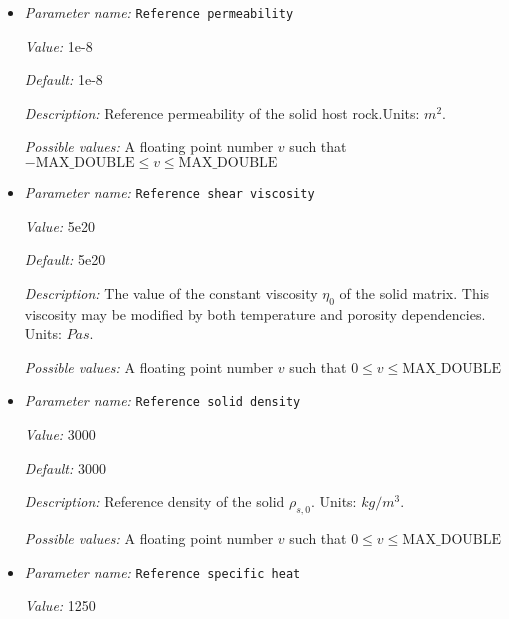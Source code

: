 \begin{itemize}
{\it Possible values:} A floating point number $v$ such that $0 \leq v \leq \text{MAX\_DOUBLE}$
\item {\it Parameter name:} {\tt Reference permeability}
\label{parameters:Material model/Melt global/Reference permeability}


{\it Value:} 1e-8


{\it Default:} 1e-8


{\it Description:} Reference permeability of the solid host rock.Units: $m^2$.


{\it Possible values:} A floating point number $v$ such that $-\text{MAX\_DOUBLE} \leq v \leq \text{MAX\_DOUBLE}$
\item {\it Parameter name:} {\tt Reference shear viscosity}
\label{parameters:Material model/Melt global/Reference shear viscosity}


{\it Value:} 5e20


{\it Default:} 5e20


{\it Description:} The value of the constant viscosity $\eta_0$ of the solid matrix. This viscosity may be modified by both temperature and porosity dependencies. Units: $Pa s$.


{\it Possible values:} A floating point number $v$ such that $0 \leq v \leq \text{MAX\_DOUBLE}$
\item {\it Parameter name:} {\tt Reference solid density}
\label{parameters:Material model/Melt global/Reference solid density}


{\it Value:} 3000


{\it Default:} 3000


{\it Description:} Reference density of the solid $\rho_{s,0}$. Units: $kg/m^3$.


{\it Possible values:} A floating point number $v$ such that $0 \leq v \leq \text{MAX\_DOUBLE}$
\item {\it Parameter name:} {\tt Reference specific heat}
\label{parameters:Material model/Melt global/Reference specific heat}


{\it Value:} 1250



\end{itemize}

